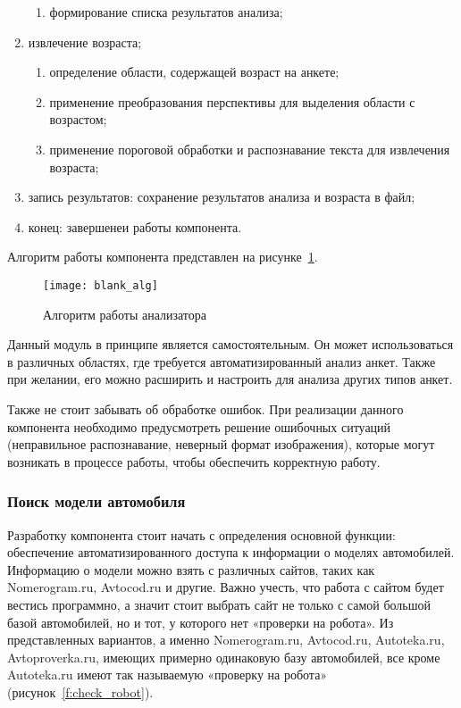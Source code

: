 \begin{enumerate}
\begin{enumerate}
            \item формирование списка результатов анализа;
        \end{enumerate}
    \item извлечение возраста;
        \begin{enumerate}
            \item определение области, содержащей возраст на анкете;
            \item применение преобразования перспективы для выделения области с возрастом;
            \item применение пороговой обработки и распознавание текста для извлечения возраста;
        \end{enumerate}
    \item запись результатов: сохранение результатов анализа и возраста в файл;
    \item конец: завершенеи работы компонента.
\end{enumerate}

Алгоритм работы компонента представлен на рисунке~\ref{f:blank_alg}.
\begin{figure}[ht]
	\centering
	\vspace{\toppaddingoffigure}
	\texttt{[image: blank\_alg]}
	\caption{Алгоритм работы анализатора}
	\label{f:blank_alg}
\end{figure}

Данный модуль в принципе является самостоятельным. Он может использоваться в различных областях, где требуется автоматизированный анализ анкет. Также при желании, его можно расширить и настроить для анализа других типов анкет.

Также не стоит забывать об обработке ошибок. При реализации данного компонента необходимо предусмотреть решение ошибочных ситуаций (неправильное распознавание, неверный формат изображения), которые могут возникать в процессе работы, чтобы обеспечить корректную работу.


\subsubsection{Поиск модели автомобиля}

Разработку компонента стоит начать с определения основной функции: обеспечение автоматизированного доступа к информации о моделях автомобилей. Информацию о модели можно взять с различных сайтов, таких как Nomerogram.ru, Avtocod.ru и другие. Важно учесть, что работа с сайтом будет вестись программно, а значит стоит выбрать сайт не только с самой большой базой автомобилей, но и тот, у которого нет «проверки на робота». Из представленных вариантов, а именно Nomerogram.ru, Avtocod.ru, Autoteka.ru, Avtoproverka.ru, имеющих примерно одинаковую базу автомобилей, все кроме Autoteka.ru имеют так называемую «проверку на робота» (рисунок~\ref{f:check_robot}).


